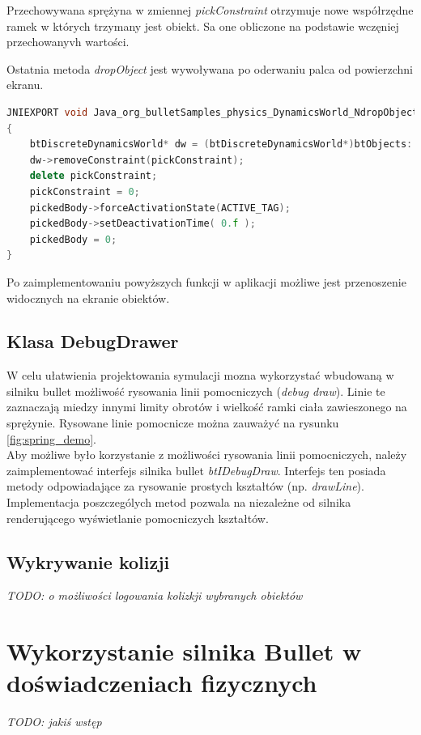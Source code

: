 Przechowywana sprężyna w zmiennej \emph{pickConstraint} otrzymuje nowe
współrzędne ramek w których trzymany jest obiekt. Sa one obliczone na podstawie
wczęniej przechowanyvh wartości.

Ostatnia metoda \emph{dropObject} jest wywoływana po oderwaniu palca od
powierzchni ekranu.

\begin{lstlisting}[language=c++, caption=Implementacja
metody dropObject,label=lis:dropObject]
JNIEXPORT void Java_org_bulletSamples_physics_DynamicsWorld_NdropObject( JNIEnv* env, jobject self, jint id, jobject jRayFrom, jobject jRayTo )
{
	btDiscreteDynamicsWorld* dw = (btDiscreteDynamicsWorld*)btObjects::get(id);
	dw->removeConstraint(pickConstraint);
	delete pickConstraint;
	pickConstraint = 0;
	pickedBody->forceActivationState(ACTIVE_TAG);
	pickedBody->setDeactivationTime( 0.f );
	pickedBody = 0;
}
\end{lstlisting}

Po zaimplementowaniu powyższych funkcji w aplikacji możliwe jest przenoszenie
widocznych na ekranie obiektów.

\subsection{Klasa DebugDrawer}\label{sec:debugDrawer}
W celu ułatwienia projektowania symulacji mozna wykorzystać
wbudowaną w silniku bullet możliwość rysowania linii pomocniczych (\emph{debug
draw}). Linie te zaznaczają miedzy innymi limity obrotów i wielkość ramki ciała
zawieszonego na sprężynie. Rysowane linie pomocnicze można zauważyć na rysunku
\ref{fig:spring_demo}.\\
Aby możliwe było korzystanie z możliwości rysowania linii pomocniczych, należy
zaimplementować interfejs silnika bullet \emph{btIDebugDraw}. Interfejs ten
posiada metody odpowiadające za rysowanie prostych kształtów (np. \emph{drawLine}).
Implementacja poszczególych metod pozwala na niezależne od silnika renderującego
wyświetlanie pomocniczych kształtów.



\subsection{Wykrywanie kolizji}
\emph{TODO: o możliwości logowania kolizkji wybranych obiektów}

\newpage
\section{Wykorzystanie silnika Bullet w doświadczeniach fizycznych}
\emph{TODO: jakiś wstęp}

